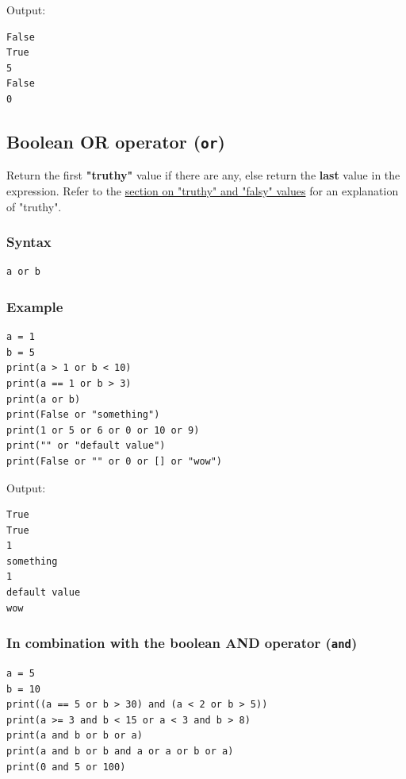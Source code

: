 \documentclass[11pt]{article}
\begin{document}
 \noindent Output:

\begin{verbatim}
False
True
5
False
0
\end{verbatim}


 \newpage

\subsection{Boolean OR operator (\texttt{or})}
\label{sec:org23b82fe}
Return the first \textbf{"truthy"} value if there are any, else return the \textbf{last} value in the expression. Refer to the \hyperref[org885cbd7]{section on "truthy" and "falsy" values} for an explanation of "truthy".

\subsubsection{Syntax}
\label{sec:orga5361f3}
\begin{verbatim}
a or b
\end{verbatim}

\subsubsection{Example}
\label{sec:org7c026bf}
\begin{verbatim}
a = 1
b = 5
print(a > 1 or b < 10)
print(a == 1 or b > 3)
print(a or b)
print(False or "something")
print(1 or 5 or 6 or 0 or 10 or 9)
print("" or "default value")
print(False or "" or 0 or [] or "wow")
\end{verbatim}

 \noindent Output:

\begin{verbatim}
True
True
1
something
1
default value
wow
\end{verbatim}


 \newpage

\subsubsection{In combination with the boolean AND operator (\texttt{and})}
\label{sec:orga78d58c}
\begin{verbatim}
a = 5
b = 10
print((a == 5 or b > 30) and (a < 2 or b > 5))
print(a >= 3 and b < 15 or a < 3 and b > 8)
print(a and b or b or a)
print(a and b or b and a or a or b or a)
print(0 and 5 or 100)
\end{verbatim}
\end{document}
